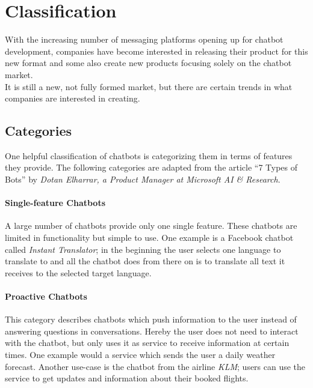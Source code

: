 \section{Classification}
\label{classification}


With the increasing number of messaging platforms opening up for chatbot development,
companies have become interested in releasing their product for this new format and some also create new products focusing solely on the chatbot market.
\\

It is still a new, not fully formed market, but there are certain trends in what companies are interested in creating.
\\

\subsection{Categories}

One helpful classification of chatbots is categorizing them in terms of features they provide.
The following categories are adapted from the article ``7 Types of Bots'' by \emph{Dotan Elharrar, a Product Manager at Microsoft AI \& Research}\cite{bottypes}.


\paragraph{Single-feature Chatbots}

A large number of chatbots provide only one single feature.
These chatbots are limited in functionality but simple to use.
One example is a Facebook chatbot called \emph{Instant Translator}\cite{instanttranslator};
in the beginning the user selects one language to translate to and all the chatbot does from there on is to translate all text it receives to the selected target language.


\paragraph{Proactive Chatbots}

This category describes chatbots which push information to the user instead of answering questions in conversations.
Hereby the user does not need to interact with the chatbot, but only uses it as service to receive information at certain times.
One example would a service which sends the user a daily weather forecast.
Another use-case is the chatbot from the airline \emph{KLM}\cite{klm}; users can use the service to get updates and information about their booked flights.


